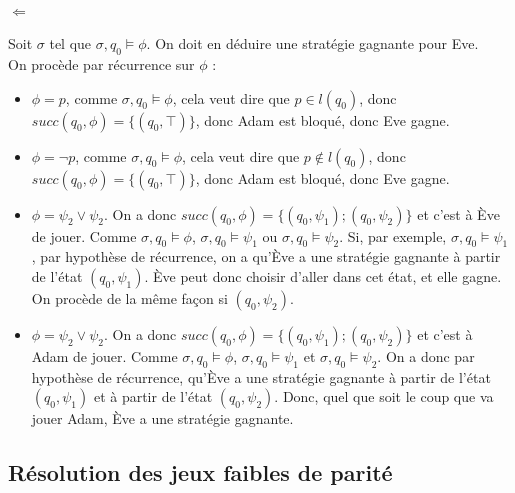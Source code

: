\documentclass[10pt,a4paper]{article}
\begin{document}
\paragraph{$\Longleftarrow$}
Soit $\sigma$ tel que $\sigma,q_0 \vDash \phi$. On doit en déduire une stratégie gagnante pour Eve.\\
On procède par récurrence sur $\phi$ :
\begin{itemize}
\item $\phi = p$, comme $\sigma,q_0 \vDash \phi$, cela veut dire que $p \in l(q_0)$, donc $succ(q_0,\phi) = \{(q_0, \top)\}$, donc Adam est bloqué, donc Eve gagne.
\item $\phi = \neg p$, comme $\sigma,q_0 \vDash \phi$, cela veut dire que $p \notin l(q_0)$, donc $succ(q_0,\phi) = \{(q_0, \top)\}$, donc Adam est bloqué, donc Eve gagne.

\item $\phi = \psi_2 \lor \psi_2$. On a donc $succ(q_0,\phi) = \{(q_0, \psi_1); (q_0, \psi_2) \}$ et c'est à Ève de jouer. Comme $\sigma,q_0 \vDash \phi$, $\sigma,q_0 \vDash \psi_1$ ou $\sigma,q_0 \vDash \psi_2$. Si, par exemple, $\sigma,q_0 \vDash \psi_1$, par hypothèse de récurrence, on a qu'Ève a une stratégie gagnante à partir de l'état $(q_0, \psi_1)$. Ève peut donc choisir d'aller dans cet état, et elle gagne. On procède de la même façon si $(q_0, \psi_2)$.

\item $\phi = \psi_2 \lor \psi_2$. On a donc $succ(q_0,\phi) = \{(q_0, \psi_1); (q_0, \psi_2) \}$ et c'est à Adam de jouer. Comme $\sigma,q_0 \vDash \phi$, $\sigma,q_0 \vDash \psi_1$ et $\sigma,q_0 \vDash \psi_2$. On a donc par hypothèse de récurrence, qu'Ève a une stratégie gagnante à partir de l'état $(q_0, \psi_1)$ et à partir de l'état $(q_0, \psi_2)$. Donc, quel que soit le coup que va jouer Adam, Ève a une stratégie gagnante.
\end{itemize}
\subsection{Résolution des jeux faibles de parité}
\end{document}
